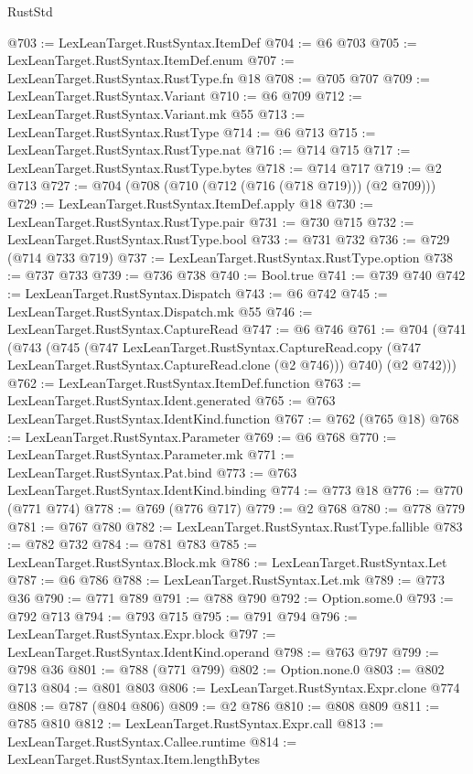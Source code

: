 \begin{lexlean}{RustStd}
\begin{coremodule}
@703 := LexLeanTarget.RustSyntax.ItemDef
@704 := @6 @703
@705 := LexLeanTarget.RustSyntax.ItemDef.enum
@707 := LexLeanTarget.RustSyntax.RustType.fn @18
@708 := @705 @707
@709 := LexLeanTarget.RustSyntax.Variant
@710 := @6 @709
@712 := LexLeanTarget.RustSyntax.Variant.mk @55
@713 := LexLeanTarget.RustSyntax.RustType
@714 := @6 @713
@715 := LexLeanTarget.RustSyntax.RustType.nat
@716 := @714 @715
@717 := LexLeanTarget.RustSyntax.RustType.bytes
@718 := @714 @717
@719 := @2 @713
@727 := @704 (@708 (@710 (@712 (@716 (@718 @719))) (@2 @709)))
@729 := LexLeanTarget.RustSyntax.ItemDef.apply @18
@730 := LexLeanTarget.RustSyntax.RustType.pair
@731 := @730 @715
@732 := LexLeanTarget.RustSyntax.RustType.bool
@733 := @731 @732
@736 := @729 (@714 @733 @719)
@737 := LexLeanTarget.RustSyntax.RustType.option
@738 := @737 @733
@739 := @736 @738
@740 := Bool.true
@741 := @739 @740
@742 := LexLeanTarget.RustSyntax.Dispatch
@743 := @6 @742
@745 := LexLeanTarget.RustSyntax.Dispatch.mk @55
@746 := LexLeanTarget.RustSyntax.CaptureRead
@747 := @6 @746
@761 := @704
    (@741
      (@743
        (@745
          (@747
            LexLeanTarget.RustSyntax.CaptureRead.copy
            (@747 LexLeanTarget.RustSyntax.CaptureRead.clone (@2 @746)))
          @740)
        (@2 @742)))
@762 := LexLeanTarget.RustSyntax.ItemDef.function
@763 := LexLeanTarget.RustSyntax.Ident.generated
@765 := @763 LexLeanTarget.RustSyntax.IdentKind.function
@767 := @762 (@765 @18)
@768 := LexLeanTarget.RustSyntax.Parameter
@769 := @6 @768
@770 := LexLeanTarget.RustSyntax.Parameter.mk
@771 := LexLeanTarget.RustSyntax.Pat.bind
@773 := @763 LexLeanTarget.RustSyntax.IdentKind.binding
@774 := @773 @18
@776 := @770 (@771 @774)
@778 := @769 (@776 @717)
@779 := @2 @768
@780 := @778 @779
@781 := @767 @780
@782 := LexLeanTarget.RustSyntax.RustType.fallible
@783 := @782 @732
@784 := @781 @783
@785 := LexLeanTarget.RustSyntax.Block.mk
@786 := LexLeanTarget.RustSyntax.Let
@787 := @6 @786
@788 := LexLeanTarget.RustSyntax.Let.mk
@789 := @773 @36
@790 := @771 @789
@791 := @788 @790
@792 := Option.some.{0}
@793 := @792 @713
@794 := @793 @715
@795 := @791 @794
@796 := LexLeanTarget.RustSyntax.Expr.block
@797 := LexLeanTarget.RustSyntax.IdentKind.operand
@798 := @763 @797
@799 := @798 @36
@801 := @788 (@771 @799)
@802 := Option.none.{0}
@803 := @802 @713
@804 := @801 @803
@806 := LexLeanTarget.RustSyntax.Expr.clone @774
@808 := @787 (@804 @806)
@809 := @2 @786
@810 := @808 @809
@811 := @785 @810
@812 := LexLeanTarget.RustSyntax.Expr.call
@813 := LexLeanTarget.RustSyntax.Callee.runtime
@814 := LexLeanTarget.RustSyntax.Item.lengthBytes

\end{coremodule}
\end{lexlean}
